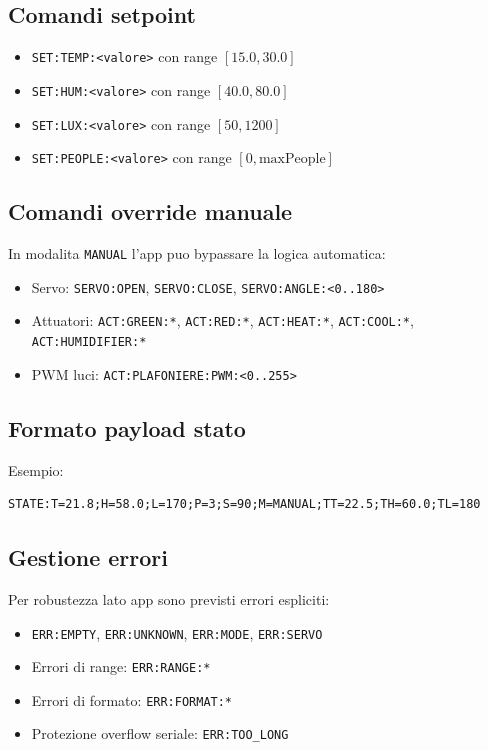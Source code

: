 \subsection{Comandi setpoint}
\begin{itemize}
  \item \texttt{SET:TEMP:<valore>} con range $[15.0,30.0]$
  \item \texttt{SET:HUM:<valore>} con range $[40.0,80.0]$
  \item \texttt{SET:LUX:<valore>} con range $[50,1200]$
  \item \texttt{SET:PEOPLE:<valore>} con range $[0,\mathrm{maxPeople}]$
\end{itemize}

\subsection{Comandi override manuale}
In modalita \texttt{MANUAL} l'app puo bypassare la logica automatica:
\begin{itemize}
  \item Servo: \texttt{SERVO:OPEN}, \texttt{SERVO:CLOSE}, \texttt{SERVO:ANGLE:<0..180>}
  \item Attuatori: \texttt{ACT:GREEN:*}, \texttt{ACT:RED:*}, \texttt{ACT:HEAT:*}, \texttt{ACT:COOL:*}, \texttt{ACT:HUMIDIFIER:*}
  \item PWM luci: \texttt{ACT:PLAFONIERE:PWM:<0..255>}
\end{itemize}

\subsection{Formato payload stato}
Esempio:
\begin{lstlisting}[style=cppstyle]
STATE:T=21.8;H=58.0;L=170;P=3;S=90;M=MANUAL;TT=22.5;TH=60.0;TL=180
\end{lstlisting}

\subsection{Gestione errori}
Per robustezza lato app sono previsti errori espliciti:
\begin{itemize}
  \item \texttt{ERR:EMPTY}, \texttt{ERR:UNKNOWN}, \texttt{ERR:MODE}, \texttt{ERR:SERVO}
  \item Errori di range: \texttt{ERR:RANGE:*}
  \item Errori di formato: \texttt{ERR:FORMAT:*}
  \item Protezione overflow seriale: \texttt{ERR:TOO\_LONG}
\end{itemize}

